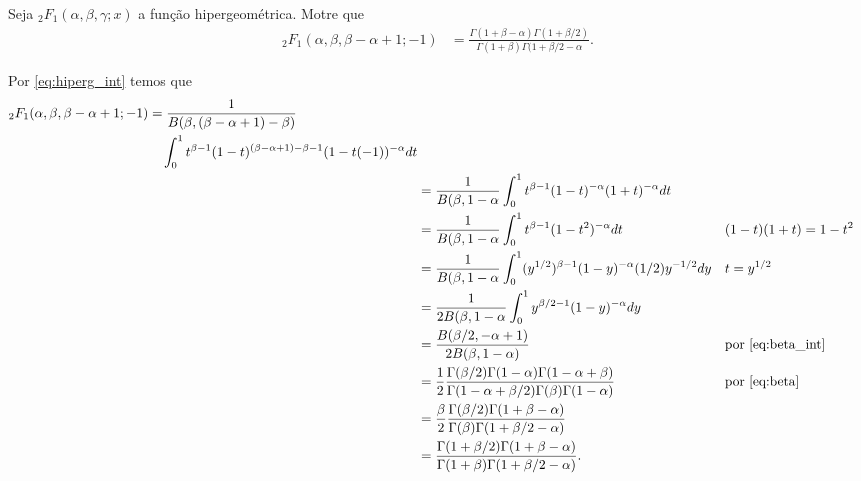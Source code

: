 \documentclass[a4paper,10pt, leqno, answers]{exam}  %
\begin{document}
\begin{questions}
    \question[P2 de 2011] Seja ${}_2F_1(\alpha, \beta, \gamma; x)$ a fun\c{c}\~{a}o hipergeom\'{e}trica. Motre que
    \begin{align*}
        {}_2F_1(\alpha, \beta, \beta - \alpha + 1; -1) &= \frac{\Gamma(1 + \beta - \alpha) \Gamma(1 + \beta/2)}{\Gamma(1 + \beta) \Gamma(1 + \beta/2 - \alpha}.
    \end{align*}
    \begin{solution}
        Por \eqref{eq:hiperg_int} temos que
        \begin{align*}
            \begin{split}
                {}_2F_1(\alpha, \beta, \beta - \alpha + 1; -1) &= \frac{1}{B(\beta, (\beta -\alpha + 1) - \beta)} \\ &\quad \int_0^1 t^{\beta - 1} (1 - t)^{(\beta - \alpha + 1) - \beta - 1} (1 - t(-1))^{-\alpha} dt \\
            \end{split} \\
            &= \frac{1}{B(\beta, 1 - \alpha} \int_0^1 t^{\beta - 1} (1 - t)^{-\alpha} (1 + t)^{-\alpha} dt \\
            &= \frac{1}{B(\beta, 1 - \alpha} \int_0^1 t^{\beta - 1} (1 - t^2)^{-\alpha} dt && (1 - t)(1 + t) = 1 - t^2 \\
            &= \frac{1}{B(\beta, 1 - \alpha} \int_0^1 (y^{1/2})^{\beta - 1} (1 - y)^{-\alpha} (1 / 2) y^{-1/2} dy && t = y^{1/2} \\
            &= \frac{1}{2 B(\beta, 1 - \alpha} \int_0^1 y^{\beta / 2 - 1} (1 - y)^{-\alpha} dy \\
            &= \frac{B(\beta / 2, -\alpha + 1)}{2 B(\beta, 1 - \alpha)} && \text{por \eqref{eq:beta_int}} \\
            &= \frac{1}{2} \frac{\Gamma(\beta/2) \Gamma(1 - \alpha) \Gamma(1 - \alpha + \beta)}{\Gamma(1 - \alpha + \beta/2) \Gamma(\beta) \Gamma(1 - \alpha)} && \text{por \eqref{eq:beta}} \\
            &= \frac{\beta}{2} \frac{\Gamma(\beta / 2) \Gamma(1 + \beta - \alpha)}{\Gamma(\beta) \Gamma(1 + \beta / 2 - \alpha)} \\
            &= \frac{\Gamma(1 + \beta / 2) \Gamma(1 + \beta - \alpha)}{\Gamma(1 + \beta) \Gamma(1 + \beta / 2 - \alpha)}.
        \end{align*}
    \end{solution}


\end{questions}
\end{document}
